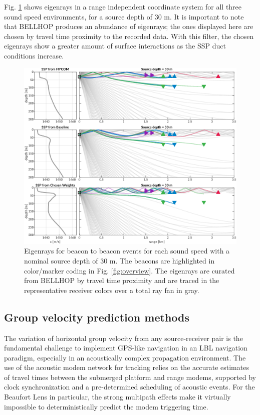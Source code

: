 Fig. \ref{fig:raytrace-zs30} shows eigenrays in a range independent coordinate system for all three sound speed environments, for a source depth of 30 m.
It is important to note that BELLHOP produces an abundance of eigenrays; the ones displayed here are chosen by travel time proximity to the recorded data.
With this filter, the chosen eigenrays show a greater amount of surface interactions as the SSP duct conditions increase.

\begin{figure}[h!]
  \centering
  \includegraphics[width=\reprintcolumnwidth]{figs/Fig4.pdf}
  \caption{Eigenrays for beacon to beacon events for each sound speed with a nominal source depth of 30 m. The beacons are highlighted in color/marker coding in Fig. \ref{fig:overview}. The eigenrays are curated from BELLHOP by travel time proximity and are traced in the representative receiver colors over a total ray fan in gray.}
  \label{fig:raytrace-zs30}
  \end{figure}

\FloatBarrier
\subsection{Group velocity prediction methods}

The variation of horizontal group velocity from any source-receiver pair is the fundamental challenge to implement GPS-like navigation in an LBL navigation paradigm, especially in an acoustically complex propagation environment.
The use of the acoustic modem network for tracking relies on the accurate estimates of travel times between the submerged platform and range modems, supported by clock synchronization and a pre-determined scheduling of acoustic events.
For the Beaufort Lens in particular, the strong multipath effects make it virtually impossible to deterministically predict the modem triggering time.

